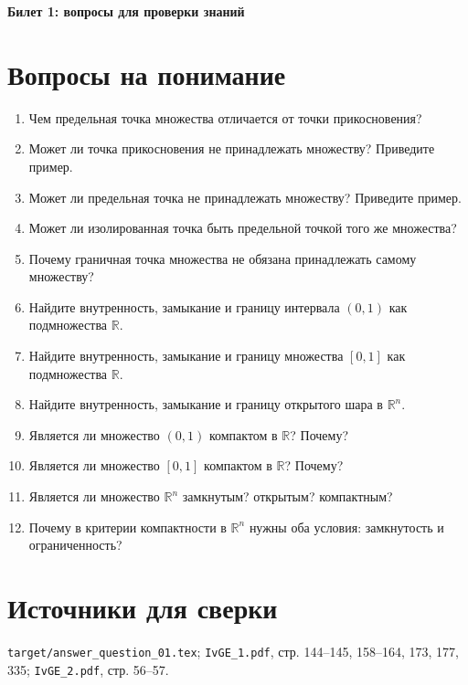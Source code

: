 \documentclass[12pt,a4paper]{article}
\begin{document}
\begin{center}
{\Large\bfseries Билет 1: вопросы для проверки знаний}
\end{center}

\noindent{}

\section*{Вопросы на понимание}

\begin{enumerate}
\item Чем предельная точка множества отличается от точки прикосновения?
\item Может ли точка прикосновения не принадлежать множеству? Приведите пример.
\item Может ли предельная точка не принадлежать множеству? Приведите пример.
\item Может ли изолированная точка быть предельной точкой того же множества?
\item Почему граничная точка множества не обязана принадлежать самому множеству?
\item Найдите внутренность, замыкание и границу интервала $(0,1)$ как подмножества $\mathbb{R}$.
\item Найдите внутренность, замыкание и границу множества $[0,1]$ как подмножества $\mathbb{R}$.
\item Найдите внутренность, замыкание и границу открытого шара в $\mathbb{R}^n$.
\item Является ли множество $(0,1)$ компактом в $\mathbb{R}$? Почему?
\item Является ли множество $[0,1]$ компактом в $\mathbb{R}$? Почему?
\item Является ли множество $\mathbb{R}^n$ замкнутым? открытым? компактным?
\item Почему в критерии компактности в $\mathbb{R}^n$ нужны оба условия: замкнутость и ограниченность?
\end{enumerate}

\section*{Источники для сверки}

\texttt{target/answer\_question\_01.tex};
\texttt{IvGE\_1.pdf}, стр. 144--145, 158--164, 173, 177, 335;
\texttt{IvGE\_2.pdf}, стр. 56--57.
\end{document}
